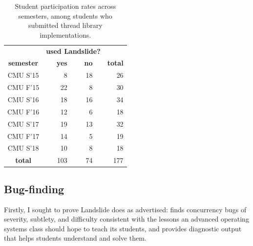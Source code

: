 \begin{table}[h]
	\begin{center}
		\begin{tabular}{c|crcrc|r}
			& \multicolumn{5}{c|}{\bf used Landslide?} & \\
			\bf semester & & \bf yes & & \bf no & & \bf total \\
			\hline
			CMU S'15	& &   8	& &  18	& &  26 \\
			CMU F'15	& &  22	& &   8	& &  30 \\
			CMU S'16	& &  18	& &  16	& &  34 \\
			CMU F'16	& &  12	& &   6	& &  18 \\
			CMU S'17	& &  19	& &  13	& &  32 \\
			CMU F'17	& &  14	& &   5	& &  19 \\
			CMU S'18	& &  10	& &   8	& &  18 \\
			\hline
			\bf total	& & 103	& &  74	& & 177 \\
		\end{tabular}
	\end{center}
	\caption{Student participation rates across semesters,
		among students who submitted thread library implementations.}
	\label{tab:photo-of-ze-studence}
\end{table}

\subsection{Bug-finding}
\label{sec:education-eval-bugfinding}

Firstly, I sought to prove Landslide does as advertised:
finds concurrency bugs of severity, subtlety, and difficulty
consistent with the lessons an advanced operating systems class should hope to teach its students,
and provides diagnostic output that helps students understand and solve them.

